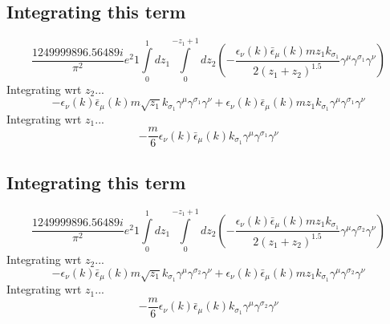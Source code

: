 \subsection*{Integrating this term}
\begin{dmath}\frac{1249999896.56489 i}{\pi^{2}} e^{2}1\int\limits_{ 0 }^{ 1 } d{ z_{ 1 } }\int\limits_{ 0 }^{ - { z_{ 1 } } + 1 } d{ z_{ 2 } }\left(- \frac{\epsilon_{ \nu }({ k }) \bar{\epsilon}_{ \mu }({ k }) m { z_{ 1 } } { { k }_{ \sigma_1 } }}{2 \left({ z_{ 1 } } + { z_{ 2 } }\right)^{1.5}} { \gamma^{ \mu } } { \gamma^{ \sigma_1 } } { \gamma^{ \nu } }\right)\end{dmath}
Integrating wrt ${ z_{ 2 } }$...
\begin{dmath}- \epsilon_{ \nu }({ k }) \bar{\epsilon}_{ \mu }({ k }) m \sqrt{{ z_{ 1 } }} { { k }_{ \sigma_1 } } { \gamma^{ \mu } } { \gamma^{ \sigma_1 } } { \gamma^{ \nu } } + \epsilon_{ \nu }({ k }) \bar{\epsilon}_{ \mu }({ k }) m { z_{ 1 } } { { k }_{ \sigma_1 } } { \gamma^{ \mu } } { \gamma^{ \sigma_1 } } { \gamma^{ \nu } }\end{dmath}
Integrating wrt ${ z_{ 1 } }$...
\begin{dmath}- \frac{m}{6} \epsilon_{ \nu }({ k }) \bar{\epsilon}_{ \mu }({ k }) { { k }_{ \sigma_1 } } { \gamma^{ \mu } } { \gamma^{ \sigma_1 } } { \gamma^{ \nu } }\end{dmath}
\subsection*{Integrating this term}
\begin{dmath}\frac{1249999896.56489 i}{\pi^{2}} e^{2}1\int\limits_{ 0 }^{ 1 } d{ z_{ 1 } }\int\limits_{ 0 }^{ - { z_{ 1 } } + 1 } d{ z_{ 2 } }\left(- \frac{\epsilon_{ \nu }({ k }) \bar{\epsilon}_{ \mu }({ k }) m { z_{ 1 } } { { k }_{ \sigma_1 } }}{2 \left({ z_{ 1 } } + { z_{ 2 } }\right)^{1.5}} { \gamma^{ \mu } } { \gamma^{ \sigma_2 } } { \gamma^{ \nu } }\right)\end{dmath}
Integrating wrt ${ z_{ 2 } }$...
\begin{dmath}- \epsilon_{ \nu }({ k }) \bar{\epsilon}_{ \mu }({ k }) m \sqrt{{ z_{ 1 } }} { { k }_{ \sigma_1 } } { \gamma^{ \mu } } { \gamma^{ \sigma_2 } } { \gamma^{ \nu } } + \epsilon_{ \nu }({ k }) \bar{\epsilon}_{ \mu }({ k }) m { z_{ 1 } } { { k }_{ \sigma_1 } } { \gamma^{ \mu } } { \gamma^{ \sigma_2 } } { \gamma^{ \nu } }\end{dmath}
Integrating wrt ${ z_{ 1 } }$...
\begin{dmath}- \frac{m}{6} \epsilon_{ \nu }({ k }) \bar{\epsilon}_{ \mu }({ k }) { { k }_{ \sigma_1 } } { \gamma^{ \mu } } { \gamma^{ \sigma_2 } } { \gamma^{ \nu } }\end{dmath}
